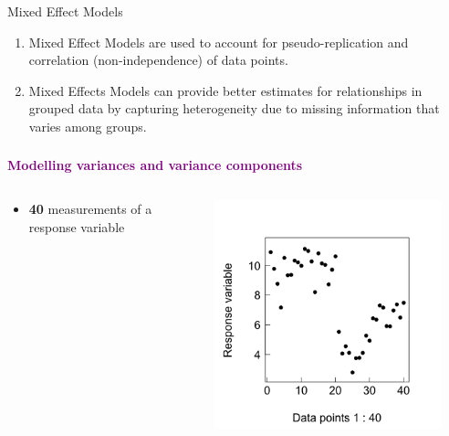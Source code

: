 \documentclass{beamer}
\begin{document}
\begin{frame}{Mixed Effect Models}
  \begin{enumerate}
      \item Mixed Effect Models are used to account for pseudo-replication and correlation (non-independence) of data points.
      \item Mixed Effects Models can provide better estimates for relationships in grouped data by capturing heterogeneity due to missing information that varies among groups.
      \end{enumerate}
\end{frame}

\begin{frame}
  \frametitle{}
  \begin{center}
    \huge\textbf{\textcolor{purple}{Modelling variances and variance components}}
  \end{center}
\end{frame}

\begin{frame}{}
  \begin{columns}[onlytextwidth] %
    \begin{column}{0.44\textwidth}
  \begin{itemize}
    \item \textbf{40} measurements of a response variable
  \end{itemize}
    \end{column}
    \hspace{0.02\textwidth} %
    \begin{column}{0.6\textwidth}
      \begin{center}
        \includegraphics[width=0.9\textwidth]{lectures/day_1_intro_to_mems/figures/unnamed-chunk-16-1.png}
      \end{center}
    \end{column}
  \end{columns}
\end{frame}
\end{document}

